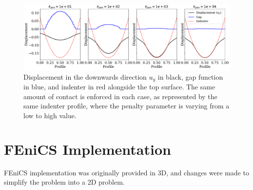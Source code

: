 \documentclass[12pt,3p]{article}
\begin{document}
\begin{figure}[!htb]
\centering
\includegraphics[width=\textwidth]{./Images/PenaltyVarying.pdf}
\caption{Displacement in the downwards direction $u_y$ in black, gap function in blue, and indenter in red alongside the top surface. The same amount of contact is enforced in each case, as represented by the same indenter profile, where the penalty parameter is varying from a low to high value.}
\label{FigPenaltyVarying}
\end{figure}


\section{FEniCS Implementation}
\vspace{-2ex}
FEniCS implementation was originally provided in 3D, and changes were made to simplify the problem into a 2D problem. 
\end{document}
